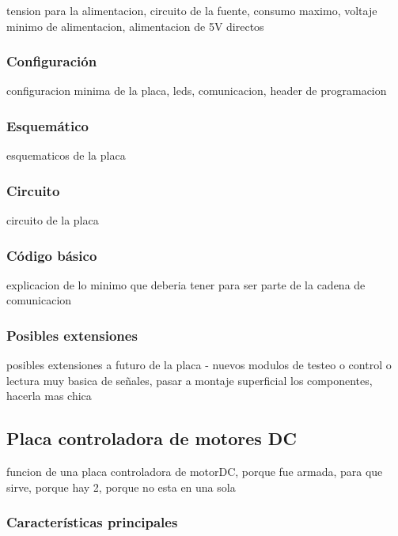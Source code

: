 tension para la alimentacion, circuito de la fuente, consumo maximo, voltaje minimo de alimentacion, alimentacion de 5V directos

\subsubsection{Configuraci\'on}
\label{}

configuracion minima de la placa, leds, comunicacion, header de programacion

\subsubsection{Esquem\'atico}
\label{}

esquematicos de la placa

\subsubsection{Circuito}
\label{}

circuito de la placa

\subsubsection{C\'odigo b\'asico}
\label{}

explicacion de lo minimo que deberia tener para ser parte de la cadena de comunicacion

\subsubsection{Posibles extensiones}
\label{}

posibles extensiones a futuro de la placa - nuevos modulos de testeo o control o lectura muy basica de señales, pasar a montaje superficial los componentes, hacerla mas chica

\subsection{Placa controladora de motores DC}
\label{}

funcion de una placa controladora de motorDC, porque fue armada, para que sirve, porque hay 2, porque no esta en una sola

\subsubsection{Caracter\'isticas principales}
\label{}

